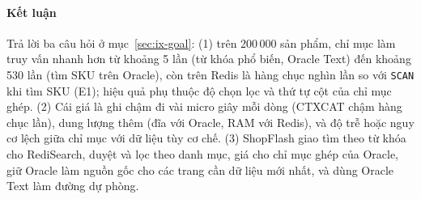 \paragraph{Kết luận}\label{sec:ix-summary}

Trả lời ba câu hỏi ở mục~\ref{sec:ix-goal}: (1) trên 200\,000 sản phẩm, chỉ mục làm truy vấn nhanh hơn từ khoảng 5 lần (từ khóa phổ biến, Oracle Text) đến khoảng 530 lần (tìm SKU trên Oracle), còn trên Redis là hàng chục nghìn lần so với \texttt{SCAN} khi tìm SKU (E1); hiệu quả phụ thuộc độ chọn lọc và thứ tự cột của chỉ mục ghép. (2) Cái giá là ghi chậm đi vài micro giây mỗi dòng (CTXCAT chậm hàng chục lần), dung lượng thêm (đĩa với Oracle, RAM với Redis), và độ trễ hoặc nguy cơ lệch giữa chỉ mục với dữ liệu tùy cơ chế. (3) ShopFlash giao tìm theo từ khóa cho RediSearch, duyệt và lọc theo danh mục, giá cho chỉ mục ghép của Oracle, giữ Oracle làm nguồn gốc cho các trang cần dữ liệu mới nhất, và dùng Oracle Text làm đường dự phòng.

\endgroup
